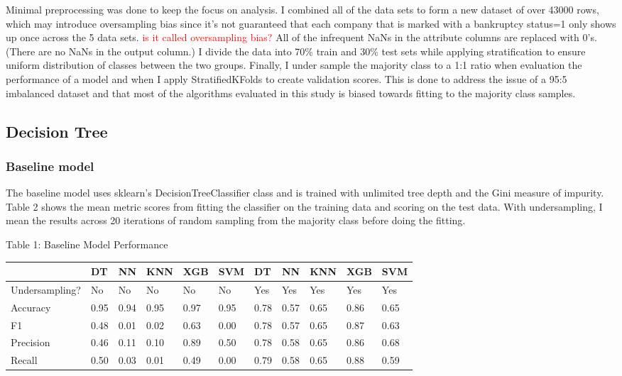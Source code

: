 \documentclass{article}
\newcommand\todo[1]{\textcolor{red}{#1}}
\begin{document}
Minimal preprocessing was done to keep the focus on analysis. I combined all of the data sets to form a new dataset of over 43000 rows, which may introduce oversampling bias since it's not guaranteed that each company that is marked with a bankruptcy status=1 only shows up once across the 5 data sets. \todo{is it called oversampling bias?} All of the infrequent NaNs in the attribute columns are replaced with 0's. (There are no NaNs in the output column.) I divide the data into 70\% train and 30\% test sets while applying stratification to ensure uniform distribution of classes between the two groups. Finally, I under sample the majority class to a 1:1 ratio when evaluation the performance of a model and when I apply StratifiedKFolds to create validation scores. This is done to address the issue of a 95:5 imbalanced dataset and that most of the algorithms evaluated in this study is biased towards fitting to the majority class samples.


\subsection{Decision Tree}

\subsubsection*{Baseline model}

The baseline model uses sklearn's DecisionTreeClassifier class and is trained with unlimited tree depth and the Gini measure of impurity. Table 2 shows the mean metric scores from fitting the classifier on the training data and scoring on the test data. With undersampling, I mean the results across 20 iterations of random sampling from the majority class before doing the fitting.


\begin{table}
	\centering
	Table 1: Baseline Model Performance
	\begin{tabular}{ l l l l l l | l l l l l }
		\hline
		              &DT  & NN & KNN& XGB & SVM & DT & NN & KNN & XGB & SVM \\
		             \hline
		Undersampling?&No  &No  &No  & No &No  &Yes &Yes &Yes &Yes &Yes \\
		Accuracy      &0.95&0.94&0.95&0.97&0.95&0.78&0.57&0.65&0.86&0.65\\
		F1            &0.48&0.01&0.02&0.63&0.00&0.78&0.57&0.65&0.87&0.63\\
		Precision     &0.46&0.11&0.10&0.89&0.50&0.78&0.58&0.65&0.86&0.68\\
		Recall        &0.50&0.03&0.01&0.49&0.00&0.79&0.58&0.65&0.88&0.59\\

		\hline 
		
		
	\end{tabular}
\end{table}
\end{document}
